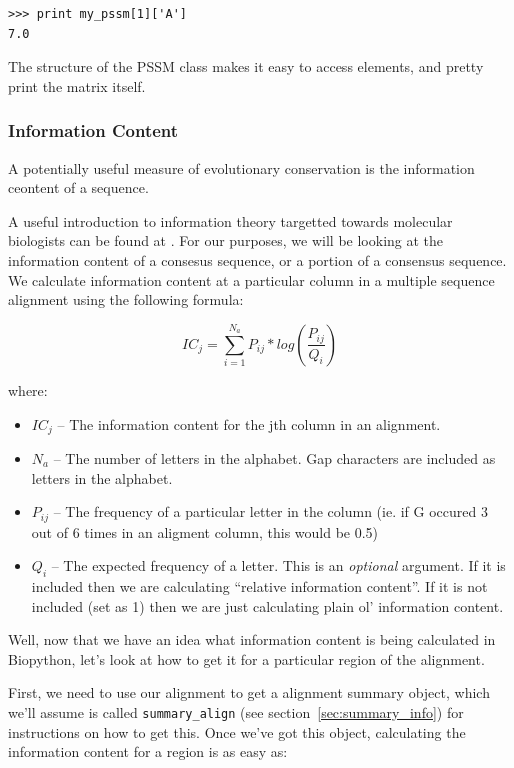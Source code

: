\documentclass{article}
\begin{document}
\begin{verbatim}
>>> print my_pssm[1]['A']
7.0
\end{verbatim}

The structure of the PSSM class makes it easy to access elements, and pretty print the matrix itself.

\subsubsection{Information Content}
\label{sec:getting_info_content}

A potentially useful measure of evolutionary conservation is the information ceontent of a sequence.


A useful introduction to information theory targetted towards molecular biologists can be found at . For our purposes, we will be looking at the information content of a consesus sequence, or a portion of a consensus sequence. We calculate information content at a particular column in a multiple sequence alignment using the following formula:

\begin{displaymath}
IC_{j} = \sum_{i=1}^{N_{a}} P_{ij} * log(\frac{P_{ij}}{Q_{i}}) 
\end{displaymath}

where:

\begin{itemize}
  \item $IC_{j}$ -- The information content for the jth column in an alignment.
  \item $N_{a}$ -- The number of letters in the alphabet. Gap characters are included as letters in the alphabet.
  \item $P_{ij}$ -- The frequency of a particular letter in the column (ie. if G occured 3 out of 6 times in an aligment column, this would be 0.5)
  \item $Q_{i}$ -- The expected frequency of a letter. This is an \emph{optional} argument. If it is included then we are calculating ``relative information content''. If it is not included (set as 1) then we are just calculating plain ol' information content.
\end{itemize}

Well, now that we have an idea what information content is being calculated in Biopython, let's look at how to get it for a particular region of the alignment.


First, we need to use our alignment to get a alignment summary object, which we'll assume is called \verb|summary_align| (see section~\ref{sec:summary_info}) for instructions on how to get this. Once we've got this object, calculating the information content for a region is as easy as:
\end{document}
